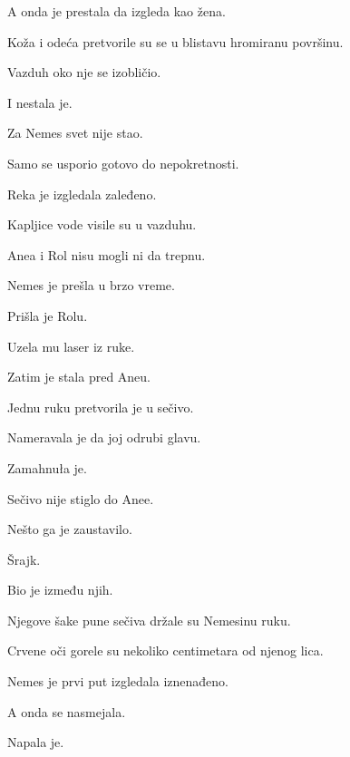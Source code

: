 \bigskip

A onda je prestala da izgleda kao žena.

\bigskip

Koža i odeća pretvorile su se u blistavu hromiranu površinu.

Vazduh oko nje se izobličio.

\bigskip

I nestala je.

\bigskip

Za Nemes svet nije stao.

Samo se usporio gotovo do nepokretnosti.

\bigskip

Reka je izgledala zaleđeno.

Kapljice vode visile su u vazduhu.

Anea i Rol nisu mogli ni da trepnu.

\bigskip

Nemes je prešla u brzo vreme.

\bigskip

Prišla je Rolu.

Uzela mu laser iz ruke.

\bigskip

Zatim je stala pred Aneu.

Jednu ruku pretvorila je u sečivo.

\bigskip

Nameravala je da joj odrubi glavu.

\bigskip

Zamahnuła je.

\bigskip

Sečivo nije stiglo do Anee.

\bigskip

Nešto ga je zaustavilo.

\bigskip

Šrajk.

\bigskip

Bio je između njih.

Njegove šake pune sečiva držale su Nemesinu ruku.

Crvene oči gorele su nekoliko centimetara od njenog lica.

\bigskip

Nemes je prvi put izgledala iznenađeno.

\bigskip

A onda se nasmejala.

\bigskip

Napala je.

